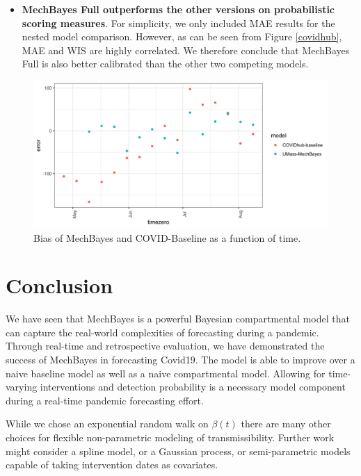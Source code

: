 \documentclass[11pt]{amsart}
\begin{document}
\begin{itemize}
\item \textbf{MechBayes Full outperforms the other versions on probabilistic scoring measures}. For simplicity, we only included MAE results for the nested model comparison. However, as can be seen from Figure \ref{covidhub}, MAE and WIS are highly correlated. We therefore conclude that MechBayes Full is also better calibrated than the other two competing models. 
\end{itemize}


\begin{figure}
\centering
\includegraphics[scale=.15]{bias_by_timezero.png}
\caption{Bias of MechBayes and COVID-Baseline as a function of time.  }
\label{fig:results_discussion}
\end{figure}



\section{Conclusion}

We have seen that MechBayes is a powerful Bayesian compartmental model that can capture the real-world complexities of forecasting during a pandemic. Through real-time and retrospective evaluation, we have demonstrated the success of MechBayes in forecasting Covid19. The model is able to improve over a naive baseline model as well as a naive compartmental model. Allowing for time-varying interventions and detection probability is a necessary model component during a real-time pandemic forecasting effort. 

While we chose an exponential random walk on $\beta(t)$ there are many other choices for flexible non-parametric modeling of transmissibility. Further work might consider a spline model, or a Gaussian process, or semi-parametric models capable of taking intervention dates as covariates. 
\end{document}
